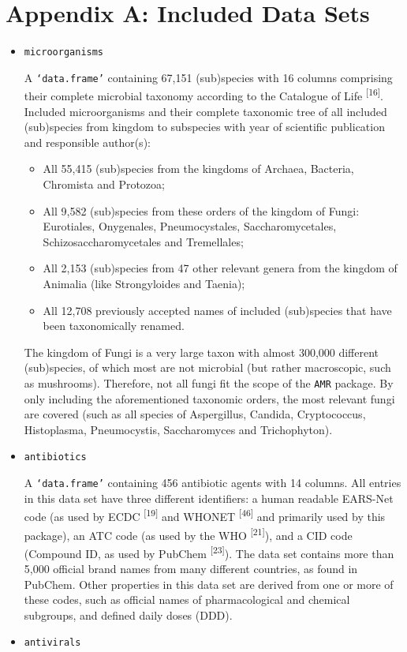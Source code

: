 \documentclass[
]{book}
\providecommand{\tightlist}{%
  \setlength{\itemsep}{0pt}\setlength{\parskip}{0pt}}
\begin{document}
\hypertarget{appendix-a-included-data-sets}{%
\section*{Appendix A: Included Data Sets}\label{appendix-a-included-data-sets}}

\begin{itemize}
\item
  \texttt{microorganisms}

  A \texttt{‘data.frame’} containing 67,151 (sub)species with 16 columns comprising their complete microbial taxonomy according to the Catalogue of Life \textsuperscript{{[}16{]}}. Included microorganisms and their complete taxonomic tree of all included (sub)species from kingdom to subspecies with year of scientific publication and responsible author(s):

  \begin{itemize}
  \tightlist
  \item
    All 55,415 (sub)species from the kingdoms of Archaea, Bacteria, Chromista and Protozoa;
  \item
    All 9,582 (sub)species from these orders of the kingdom of Fungi: Eurotiales, Onygenales, Pneumocystales, Saccharomycetales, Schizosaccharomycetales and Tremellales;
  \item
    All 2,153 (sub)species from 47 other relevant genera from the kingdom of Animalia (like Strongyloides and Taenia);
  \item
    All 12,708 previously accepted names of included (sub)species that have been taxonomically renamed.
  \end{itemize}

  The kingdom of Fungi is a very large taxon with almost 300,000 different (sub)species, of which most are not microbial (but rather macroscopic, such as mushrooms). Therefore, not all fungi fit the scope of the \texttt{AMR} package. By only including the aforementioned taxonomic orders, the most relevant fungi are covered (such as all species of Aspergillus, Candida, Cryptococcus, Histoplasma, Pneumocystis, Saccharomyces and Trichophyton).
\item
  \texttt{antibiotics}

  A \texttt{‘data.frame’} containing 456 antibiotic agents with 14 columns. All entries in this data set have three different identifiers: a human readable EARS-Net code (as used by ECDC \textsuperscript{{[}19{]}} and WHONET \textsuperscript{{[}46{]}} and primarily used by this package), an ATC code (as used by the WHO \textsuperscript{{[}21{]}}), and a CID code (Compound ID, as used by PubChem \textsuperscript{{[}23{]}}). The data set contains more than 5,000 official brand names from many different countries, as found in PubChem. Other properties in this data set are derived from one or more of these codes, such as official names of pharmacological and chemical subgroups, and defined daily doses (DDD).
\item
  \texttt{antivirals}


\end{itemize}
\end{document}
